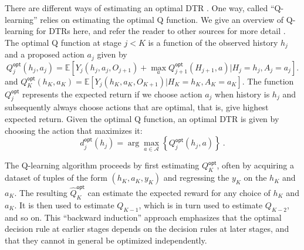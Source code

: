 There are different ways of estimating an optimal DTR \cite{tsiatis2019dynamic}. One way, called ``Q-learning'' relies on estimating the optimal Q function. We give an overview of Q-learning for DTRs here, and refer the reader to other sources for more detail \cite{chakraborty2013statistical}. The optimal Q function at stage $j < K$ is a function of the observed history $ h_j $ and a proposed action $ a_j $ given by
\begin{equation}\label{eq:Qfunction}
 Q_j^{\mathsf{opt}}(h_j, a_j) = \mathbb{E} \left[ Y_j(h_j, a_j, O_{j+1}) + \max_a Q_{j+1}^{\mathsf{opt}}(H_{j+1}, a) | H_j = h_j, A_j = a_j
 \right].
\end{equation}
and $Q_K^{\mathsf{opt}}(h_K, a_K) = \mathbb{E}[ Y_j(h_K, a_K, O_{K+1}) | H_K = h_K, A_K = a_K]$. The function $Q_j^{\mathsf{opt}}$ represents the expected return if we choose action $a_j$ when history is $h_j$ and subsequently always choose actions that are optimal, that is, give highest expected return. Given the optimal Q function, an optimal DTR is given by choosing the action that maximizes it:
\begin{equation}
d_j^{\mathsf{opt}}(h_j) = \arg\max_{a\in \mathcal{A}} \left\{Q_j^{\mathsf{opt}}(h_j,a)\right\} \>.
\end{equation}

The Q-learning algorithm proceeds by first estimating $Q_K^{\mathsf{opt}}$, often by acquiring a dataset of tuples of the form $(h_K, a_K, y_K)$ and regressing the $y_K$ on the $h_K$ and $a_K$. The resulting $\hat{Q}_K^{\mathsf{opt}}$ can estimate the expected reward for any choice of $h_K$ and $a_K$. It is then used to estimate $Q_{K-1}$, which is in turn used to estimate $Q_{K-2}$, and so on. This ``backward induction'' approach emphasizes that the optimal decision rule at earlier stages depends on the decision rules at later stages, and that they cannot in general be optimized independently.


